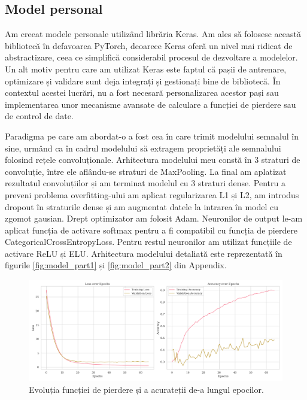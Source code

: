 \subsection{Model personal}
Am creeat modele personale utilizând librăria Keras\cite{keras}. Am ales să folosesc această bibliotecă în defavoarea PyTorch, deoarece Keras oferă un nivel mai ridicat de abstractizare, ceea ce simplifică considerabil procesul de dezvoltare a modelelor. Un alt motiv pentru care am utilizat Keras este faptul că pașii de antrenare, optimizare și validare sunt deja integrați și gestionați bine de bibliotecă. În contextul acestei lucrări, nu a fost necesară personalizarea acestor pași sau implementarea unor mecanisme avansate de calculare a funcției de pierdere sau de control de date. 

Paradigma pe care am abordat-o a fost cea în care trimit modelului semnalul în sine, urmând ca în cadrul modelului să extragem proprietăți ale semnalului folosind rețele convoluționale. Arhitectura modelului meu constă în 3 straturi de convoluție, între ele aflându-se straturi de MaxPooling. La final am aplatizat rezultatul convoluțiilor și am terminat modelul cu 3 straturi dense. Pentru a preveni problema overfitting-ului am aplicat regularizarea L1 și L2, am introdus dropout în straturile dense și am augmentat datele la intrarea în model cu zgomot gausian. Drept optimizator am folosit Adam. Neuronilor de output le-am aplicat funcția de activare softmax pentru a fi compatibil cu funcția de pierdere CategoricalCrossEntropyLoss. Pentru restul neuronilor am utilizat funcțiile de activare ReLU și ELU. Arhitectura modelului detaliată este reprezentată în figurile \ref{fig:model_part1} și \ref{fig:model_part2} din Appendix.

\begin{figure}[H]
    \centering
		\vspace{-1em}
    \includegraphics[width=1\linewidth]{images/comparison_fold7.png}
    \caption{Evoluția funcției de pierdere și a acurateții de-a lungul epocilor.}
		\vspace{-1em}
    \label{fig:model_train}
\end{figure}

